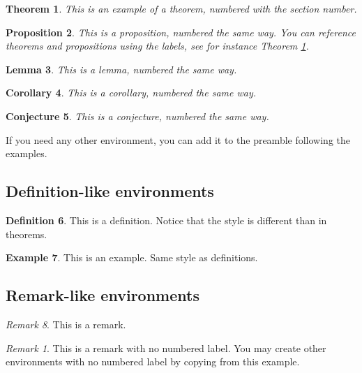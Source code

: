 \documentclass[12,twoside]{TFG-GM}
\newtheorem{theorem}{Theorem}[section]
\newtheorem{proposition}[theorem]{Proposition}
\newtheorem{lemma}[theorem]{Lemma}
\newtheorem{corollary}[theorem]{Corollary}
\newtheorem{conjecture}[theorem]{Conjecture}
\theoremstyle{definition}
\newtheorem{definition}[theorem]{Definition}
\newtheorem{example}[theorem]{Example}
\theoremstyle{remark}
\newtheorem{remark}[theorem]{Remark}
\newtheorem*{remarknonumber}{Remark}
\begin{document}
\begin{theorem} \label{th:example}
This is an example of a theorem, numbered with the section number.
\end{theorem}

\begin{proposition}
This is a proposition, numbered the same way. You can reference theorems and propositions using the labels, see for instance Theorem \ref{th:example}.
\end{proposition}

\begin{lemma}
This is a lemma, numbered the same way.
\end{lemma}

\begin{corollary}
This is a corollary, numbered the same way.
\end{corollary}

\begin{conjecture}
This is a conjecture, numbered the same way.
\end{conjecture}

If you need any other environment, you can add it to the preamble following the examples.

\subsection{Definition-like environments}

\begin{definition}
This is a definition. Notice that the style is different than in theorems.
\end{definition}

\begin{example}
This is an example. Same style as definitions.
\end{example}

\subsection{Remark-like environments}

\begin{remark}
This is a remark. 
\end{remark}

\begin{remarknonumber}
This is a remark with no numbered label. You may create other environments with no numbered label by copying from this example.
\end{remarknonumber}
\end{document}
